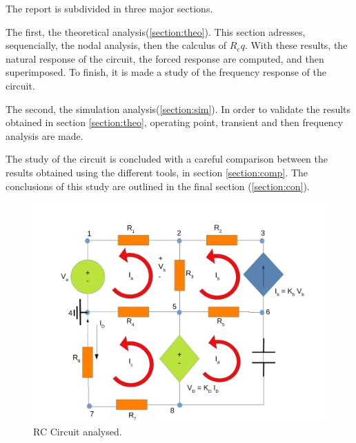 \par
The report is subdivided in three major sections.
\par The first, the theoretical analysis(\ref{section:theo}). This section adresses, sequencially, the nodal analysis, then the calculus of $R_eq$. With these results, the natural response of the circuit, the forced response are computed, and then superimposed. To finish, it is made a study of the frequency response of the circuit.
\par The second, the simulation analysis(\ref{section:sim}). In order to validate the results obtained in section \ref{section:theo}, operating point, transient and then frequency analysis are made.
\par The study of the circuit is concluded with a careful comparison between the results obtained using the different tools, in section \ref{section:comp}.
The conclusions of this study are outlined in the final section (\ref{section:con}).



\begin{figure}[ht] \centering
\includegraphics[width=0.9\linewidth]{t2draw.pdf}
\caption{ RC Circuit analysed.}
\label{RC Circuit.}
\end{figure}
\par 
   

